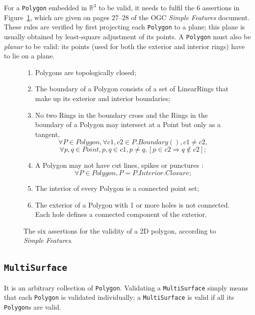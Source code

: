 For a \texttt{Polygon} embedded in $\mathbb{R}^3$ to be valid, it needs to fulfil the 6 assertions in Figure~\ref{fig:ogcsf_definitions}, which are given on pages 27--28 of the OGC \emph{Simple Features} document.
These rules are verified by first projecting each \texttt{Polygon} to a plane; this plane is usually obtained by least-square adjustment of its points.
A \texttt{Polygon} must also be \emph{planar} to be valid: its points (used for both the exterior and interior rings) have to lie on a plane.
\begin{figure}
  \centering
  \begin{boxedminipage}{\textwidth}
    {\small
  \begin{enumerate}
    \item Polygons are topologically closed;
    \item The boundary of a Polygon consists of a set of LinearRings that make up its exterior and interior boundaries;
    \item No two Rings in the boundary cross and the Rings in the boundary of a Polygon may intersect at a Point but only as a tangent, \eg\
      \[
         \forall P \in Polygon, \forall c1, c2 \in P.Boundary(), c1 \neq c2,
      \]
      \[
          \forall p, q \in Point, p, q \in c1, p \neq q, [p \in c2 \Rightarrow q \notin c2];
      \]
    \item A Polygon may not have cut lines, spikes or punctures \eg:
      \[
         \forall P \in Polygon, P = P.Interior.Closure;
      \]
    \item The interior of every Polygon is a connected point set;
    \item The exterior of a Polygon with 1 or more holes is not connected. Each hole defines a connected component of the exterior.
  \end{enumerate}
  }
  \end{boxedminipage}
\caption[Assertions for the validity of a 2D polygon]{The six assertions for the validity of a 2D polygon, according to \emph{Simple Features}.}%
\label{fig:ogcsf_definitions}
\end{figure}



\subsection{\texttt{MultiSurface}}
It is an arbitrary collection of \texttt{Polygon}.
Validating a \texttt{MultiSurface} simply means that each \texttt{Polygon} is validated individually; a \texttt{MultiSurface} is valid if all its \texttt{Polygon}s are valid.



